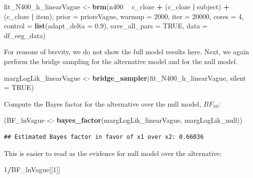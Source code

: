 \documentclass[12pt,]{krantz}
\newenvironment{Shaded}{\begin{snugshade}}{\end{snugshade}}
\newcommand{\DataTypeTok}[1]{\textcolor[rgb]{0.13,0.29,0.53}{#1}}
\newcommand{\DecValTok}[1]{\textcolor[rgb]{0.00,0.00,0.81}{#1}}
\newcommand{\FloatTok}[1]{\textcolor[rgb]{0.00,0.00,0.81}{#1}}
\newcommand{\KeywordTok}[1]{\textcolor[rgb]{0.13,0.29,0.53}{\textbf{#1}}}
\newcommand{\NormalTok}[1]{#1}
\newcommand{\OperatorTok}[1]{\textcolor[rgb]{0.81,0.36,0.00}{\textbf{#1}}}
\newcommand{\OtherTok}[1]{\textcolor[rgb]{0.56,0.35,0.01}{#1}}
\newcommand{\StringTok}[1]{\textcolor[rgb]{0.31,0.60,0.02}{#1}}
\theoremstyle{definition}
\theoremstyle{definition}
\theoremstyle{definition}
\theoremstyle{remark}
\begin{document}
\begin{Shaded}
\begin{Highlighting}[]
\NormalTok{fit_N400_h_linearVague <-}\StringTok{ }\KeywordTok{brm}\NormalTok{(n400 }\OperatorTok{~}\StringTok{ }\NormalTok{c_cloze }\OperatorTok{+}\StringTok{ }
\StringTok{        }\NormalTok{(c_cloze }\OperatorTok{|}\StringTok{ }\NormalTok{subject) }\OperatorTok{+}\StringTok{ }\NormalTok{(c_cloze }\OperatorTok{|}\StringTok{ }\NormalTok{item), }
        \DataTypeTok{prior   =}\NormalTok{ priorsVague,}
        \DataTypeTok{warmup  =} \DecValTok{2000}\NormalTok{,}
        \DataTypeTok{iter    =} \DecValTok{20000}\NormalTok{,}
        \DataTypeTok{cores   =} \DecValTok{4}\NormalTok{,}
        \DataTypeTok{control =} \KeywordTok{list}\NormalTok{(}\DataTypeTok{adapt_delta =} \FloatTok{0.9}\NormalTok{),}
        \DataTypeTok{save_all_pars =} \OtherTok{TRUE}\NormalTok{,}
        \DataTypeTok{data    =}\NormalTok{ df_eeg_data)}
\end{Highlighting}
\end{Shaded}

For reasons of brevity, we do not show the full model results here. Next, we again perform the bridge sampling for the alternative model and for the null model.

\begin{Shaded}
\begin{Highlighting}[]
\NormalTok{margLogLik_linearVague <-}\StringTok{ }\KeywordTok{bridge_sampler}\NormalTok{(fit_N400_h_linearVague, }\DataTypeTok{silent =} \OtherTok{TRUE}\NormalTok{)}
\end{Highlighting}
\end{Shaded}

Compute the Bayes factor for the alternative over the null model, \(BF_{10}\):

\begin{Shaded}
\begin{Highlighting}[]
\NormalTok{(BF_lnVague <-}\StringTok{ }\KeywordTok{bayes_factor}\NormalTok{(margLogLik_linearVague, margLogLik_null)) }
\end{Highlighting}
\end{Shaded}

\begin{verbatim}
## Estimated Bayes factor in favor of x1 over x2: 0.66036
\end{verbatim}

This is easier to read as the evidence for null model over the alternative:

\begin{Shaded}
\begin{Highlighting}[]
\DecValTok{1}\OperatorTok{/}\NormalTok{BF_lnVague[[}\DecValTok{1}\NormalTok{]] }
\end{Highlighting}
\end{Shaded}
\end{document}
